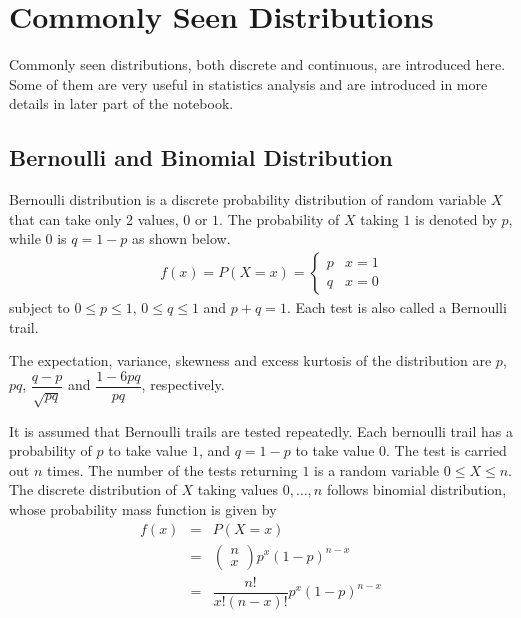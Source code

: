 \chapter{Commonly Seen Distributions} \label{ch:commondistribution}

Commonly seen distributions, both discrete and continuous, are introduced here. Some of them are very useful in statistics analysis and are introduced in more details in later part of the notebook.

\section{Bernoulli and Binomial Distribution}

Bernoulli distribution is a discrete probability distribution of random variable $X$ that can take only 2 values, $0$ or $1$. The probability of $X$ taking $1$ is denoted by $p$, while $0$ is $q=1-p$ as shown below.
\begin{eqnarray}
  && f(x) = P(X=x) = \left\{\begin{array}{cc}
                           p & x=1 \\
                           q & x=0
                         \end{array}\right. \nonumber
\end{eqnarray}
subject to $0\leq p \leq 1$, $0\leq q \leq 1$ and $p+q=1$. Each test is also called a Bernoulli trail.

The expectation, variance, skewness and excess kurtosis of the distribution are $p$, $pq$, $\dfrac{q-p}{\sqrt{pq}}$ and $\dfrac{1-6pq}{pq}$, respectively.

It is assumed that Bernoulli trails are tested repeatedly. Each bernoulli trail has a probability of $p$ to take value $1$, and $q=1-p$ to take value $0$. The test is carried out $n$ times. The number of the tests returning $1$ is a random variable $0\leq X \leq n$. The discrete distribution of $X$ taking values $0, \ldots, n$ follows binomial distribution, whose probability mass function is given by
\begin{eqnarray}
  f(x) &=& P(X=x) \nonumber \\
  &=& \left(\begin{array}{c}
              n \\
              x
            \end{array}\right)p^x(1-p)^{n-x} \nonumber \\
  &=& \dfrac{n!}{x!(n-x)!}p^x(1-p)^{n-x}
\end{eqnarray}

